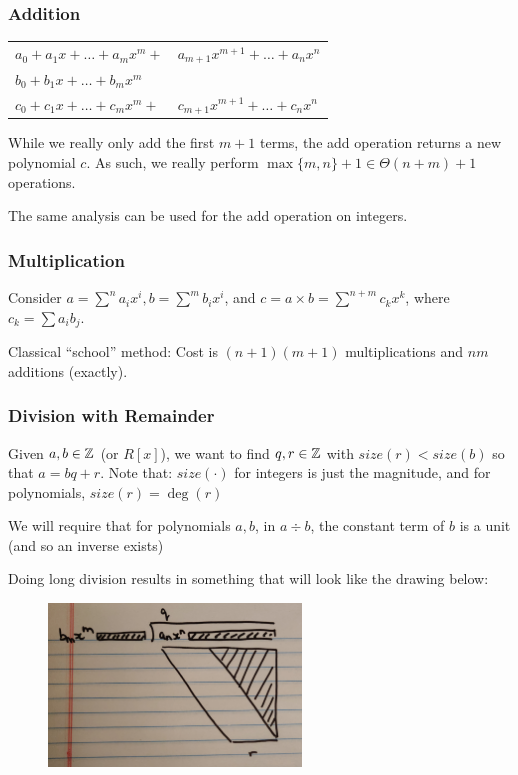\subsubsection{Addition}

\begin{center}
\begin{tabular}{ll}
    $a_0 + a_1x + \ldots + a_mx^m +$ & $a_{m+1}x^{m+1} + \ldots + a_nx^n$ \\
    $b_0 + b_1x + \ldots + b_mx^m$ & \\
    \hline
    $c_0 + c_1x + \ldots + c_mx^m +$ & $c_{m+1}x^{m+1} + \ldots + c_nx^n$ \\
\end{tabular}
\end{center}

While we really only add the first $m+1$ terms, the add operation returns a new polynomial $c$.
As such, we really perform $\max\{m,n\} + 1 \in \Theta(n + m) + 1$ operations.

The same analysis can be used for the add operation on integers. 

\subsubsection{Multiplication}

Consider $a = \sum^n a_i x^i, b = \sum^m b_i x^i$, and $c = a \times b = \sum^{n + m} c_k x^k$, where $c_k = \sum a_i b_j$.

Classical ``school'' method: Cost is $(n + 1)(m + 1)$ multiplications and $nm$ additions (exactly).

\subsubsection{Division with Remainder}
Given $a,b \in \mathbb{Z}$ (or $R[x]$), we want to find $q, r \in \mathbb{Z}$ with $size(r) < size(b)$ so that $a = bq + r$. Note that: $size(\cdot)$ for integers is just the magnitude, and for polynomials, $size(r) = \deg(r)$

We will require that for polynomials $a,b$, in $a \div b$, the constant term of $b$ is a unit (and so an inverse exists)

Doing long division results in something that will look like the drawing below:
\begin{figure}[h]
    \centering
    \includegraphics[width=0.6\textwidth]{images/lec2-long-division}
\end{figure}

